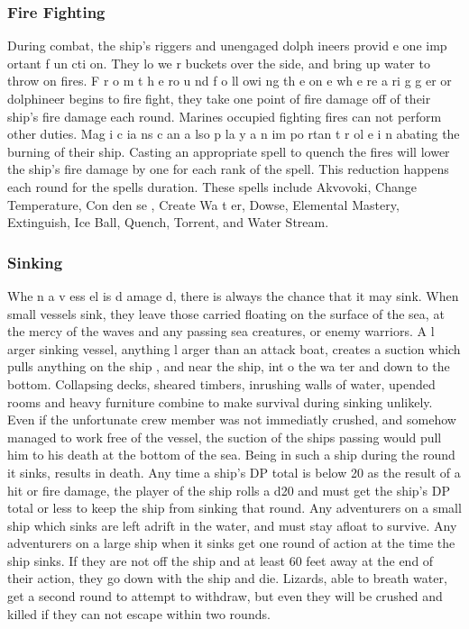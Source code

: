 \begin{multicols*}{2}
\subsubsection{Fire Fighting}
During combat, the ship’s riggers and unengaged
dolph ineers provid e one imp ortant f un cti on. They lo we r
buckets over the side, and bring up water to throw on fires.
F r o m t h e ro u nd f o ll owi ng th e on e wh e re a ri g g er or
dolphineer begins to fire fight, they take one point of fire
damage off of their ship’s fire damage each round. Marines
occupied fighting fires can not perform other duties.
Mag i c ia ns c an a lso p la y a n im po rtan t r ol e i n
abating the burning of their ship. Casting an appropriate spell
to quench the fires will lower the ship’s fire damage by one
for each rank of the spell. This reduction happens each round
for the spells duration. These spells include Akvovoki, Change
Temperature, Con den se , Create Wa t er, Dowse, Elemental
Mastery, Extinguish, Ice Ball, Quench, Torrent, and Water
Stream.
\subsubsection{Sinking}
Whe n a v ess el is d amage d, there is always the
chance that it may sink. When small vessels sink, they leave
those carried floating on the surface of the sea, at the mercy of
the waves and any passing sea creatures, or enemy warriors.
A l arger sinking vessel, anything l arger than an
attack boat, creates a suction which pulls anything on the
ship , and near the ship, int o the wa ter and down to the
bottom. Collapsing decks, sheared timbers, inrushing walls of
water, upended rooms and heavy furniture combine to make
survival during sinking unlikely. Even if the unfortunate crew
member was not immediatly crushed, and somehow managed
to work free of the vessel, the suction of the ships passing
would pull him to his death at the bottom of the sea. Being in
such a ship during the round it sinks, results in death.
Any time a ship’s DP total is below 20 as the result
of a hit or fire damage, the player of the ship rolls a d20 and
must get the ship’s DP total or less to keep the ship from
sinking that round. Any adventurers on a small ship which
sinks are left adrift in the water, and must stay afloat to
survive.
Any adventurers on a large ship when it sinks get
one round of action at the time the ship sinks. If they are not
off the ship and at least 60 feet away at the end of their action,
they go down with the ship and die. Lizards, able to breath
water, get a second round to attempt to withdraw, but even
they will be crushed and killed if they can not escape within
two rounds.
\end{multicols*}